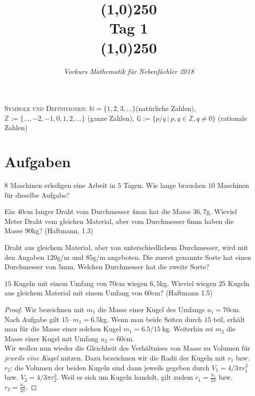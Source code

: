 \documentclass[11pt]{article}
\begin{document}
\title{\line(1,0){250}\\Tag 1\\\line(1,0){250}}
\date{}
\author{\itshape Vorkurs Mathematik für Nebenfächler 2018}
\maketitle
\begin{framed}
	\noindent \scriptsize
	\textsc{Symbole und Definitionen:} $\mathbb{N} = \{1,2,3,...\}$(natürliche Zahlen), $\mathbb{Z}:= \{...,-2,-1,0,1,2,...\}$ (ganze Zahlen), $\mathbb{Q} := \{p/q~|~p,q\in \mathbb{Z},q\neq 0\}$ (rationale Zahlen)
\end{framed}
\section*{Aufgaben}
\begin{task}
	$8$ Maschinen erledigen eine Arbeit in $5$ Tagen. Wie lange brauchen $10$ Maschinen f\"ur dieselbe Aufgabe?
\end{task}
\begin{task}
	Ein $40$cm langer Draht vom Durchmesser $4$mm hat die Masse $36,7$g. Wieviel Meter Draht vom gleichen Material, aber vom Durchmesser $6$mm haben die Masse $90$kg? (Haftmann, 1.3)
\end{task}
\begin{task}
	Draht aus gleichem Material, aber von unterschiedlichem Durchmesser, wird mit den Angaben $120$g/m und $85$g/m angeboten. Die zuerst genannte Sorte hat einen Durchmesser von $5$mm. Welchen Durchmesser hat die zweite Sorte?
\end{task}
\begin{task}
	$15$ Kugeln mit einem Umfang von $70$cm wiegen $6,5$kg. Wieviel wiegen $25$ Kugeln aus gleichem Material mit einem Umfang von $60$cm? (Haftmann 1.5)
\end{task}
\begin{proof}
	Wir bezeichnen mit $m_1$ die Masse einer Kugel des Umfangs $u_1 = 70$cm. Nach Aufgabe gilt $15\cdot m_1 = 6.5$kg. Wenn man beide Seiten durch $15$ teil, erhält man für die Masse einer solchen Kugel $m_1 = 6.5/15~\mathrm{kg}$. Weiterhin sei $m_2$ die Masse einer Kugel mit Umfang $u_2 = 60$cm.\\
	Wir wollen nun wieder die Gleichheit des Verhältnises von Masse zu Volumen für \textit{jeweils eine Kugel} nutzen. Dazu bezeichnen wir die Radii der Kugeln mit $r_1$ bzw. $r_2$; die Volumen der beiden Kugeln sind dann jeweils gegeben durch $V_1 = 4/3\pi r_1^3$ bzw. $V_2 = 4/3\pi r_2^3$. Weil es sich um Kugeln handelt, gilt zudem $r_1 = \frac{u_1}{2\pi}$ bzw. $r_2  = \frac{u_2}{2\pi}$.
\end{proof}
\end{document}
